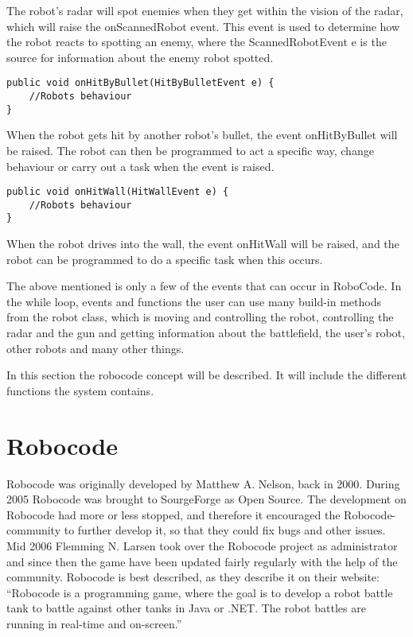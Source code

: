 The robot’s radar will spot enemies when they get within the vision of the radar, which will raise the onScannedRobot event. This event is used to determine how the robot reacts to spotting an enemy, where the ScannedRobotEvent e is the source for information about the enemy robot spotted.

\begin{lstlisting}[caption={Eksampel of the onHitByBullet event event from Robocode} label=ohbb, xleftmargin=.2\textwidth]
public void onHitByBullet(HitByBulletEvent e) {
	//Robots behaviour
}
\end{lstlisting}

When the robot gets hit by another robot’s bullet, the event onHitByBullet will be raised. The robot can then be programmed to act a specific way, change behaviour or carry out a task when the event is raised.

\begin{lstlisting}[caption={Eksampel of the onHitWall event event from Robocode} label=ohw, xleftmargin=.2\textwidth]
public void onHitWall(HitWallEvent e) {
	//Robots behaviour
}
\end{lstlisting}

When the robot drives into the wall, the event onHitWall will be raised, and the robot can be programmed to do a specific task when this occurs. 

The above mentioned is only a few of the events that can occur in RoboCode. In the while loop, events and functions the user can use many build-in methods from the robot class, which is moving and controlling the robot, controlling the radar and the gun and getting information about the battlefield, the user's robot, other robots and many other things. 


In this section the robocode concept will be described. It will include the different functions the system contains.
\section{Robocode}
Robocode was originally developed by Matthew A. Nelson, back in 2000. During 2005 Robocode was brought to SourgeForge as Open Source. The development on Robocode had more or less stopped, and therefore it encouraged the Robocode-community to further develop it, so that they could fix bugs and other issues. Mid 2006 Flemming N. Larsen took over the Robocode project as administrator and since then the game have been updated fairly regularly with the help of the community. Robocode is best described, as they describe it on their website: “Robocode is a programming game, where the goal is to develop a robot battle tank to battle against other tanks in Java or .NET. The robot battles are running in real-time and on-screen.” \citep{robocode}


